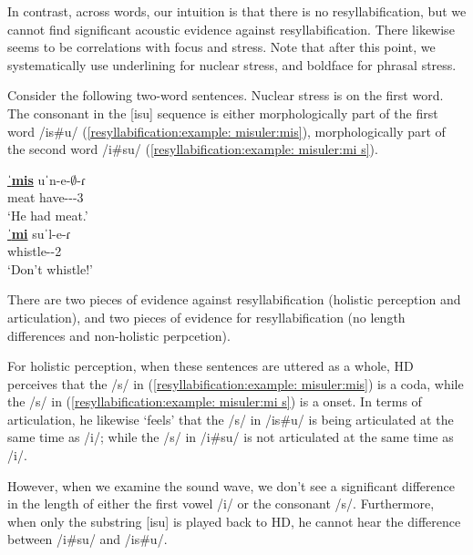 In contrast, across words, our intuition is that there is no resyllabification, but we cannot find significant acoustic evidence against resyllabification. There likewise seems to be correlations with focus and stress. Note that after this point, we systematically use underlining for nuclear stress, and boldface for phrasal stress. 

Consider the following two-word sentences. Nuclear stress  is on the first word. The consonant in the [isu] sequence is either morphologically part of the first word   /is\#u/ (\ref{resyllabification:example: misuler:mis}), morphologically   part of the second word /i\#su/ (\ref{resyllabification:example: misuler:mi s}). 

\begin{exe}
	\ex 
	\begin{xlist}
		\ex \gll \underline{ˈ\textbf{mis}} uˈn-e-$\emptyset$-ɾ \\
		meat have-{\thgloss}-{\pst}-3{\sg} \\
		\trans `He had meat.' \label{resyllabification:example: misuler:mis} \\
		\ex \gll \underline{ˈ\textbf{mi}} suˈl-e-ɾ \\
		{\proh} whistle-{\thgloss}-2{\sg} \\
		\trans `Don't whistle!' \label{resyllabification:example: misuler:mi s} \\
	\end{xlist}
\end{exe}

There are two pieces of evidence against resyllabification (holistic perception and articulation), and two pieces of evidence for resyllabification (no length differences and non-holistic perpcetion). 

For holistic perception, when these sentences are uttered as a whole, HD  perceives that the /s/ in (\ref{resyllabification:example: misuler:mis}) is a coda, while the /s/ in (\ref{resyllabification:example: misuler:mi s}) is a onset. In terms of articulation, he likewise `feels' that the /s/ in /is\#u/ is being articulated at the same time as /i/; while the /s/ in /i\#su/ is not articulated at the same time as /i/. 

However, when we examine the sound wave, we don't see a significant difference in the length of either the first vowel /i/ or the consonant /s/. Furthermore, when   only the substring [isu] is played back to HD, he cannot hear the difference between /i\#su/ and /is\#u/. 


